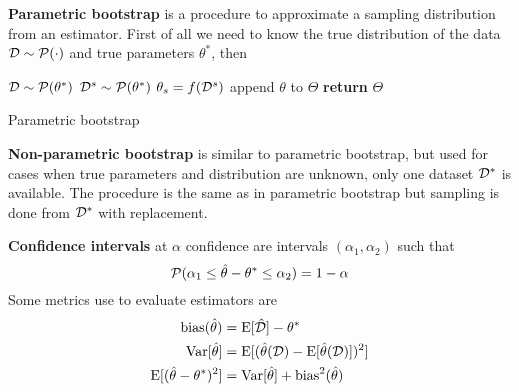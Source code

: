 \documentclass[../../main.tex]{subfiles}
\begin{document}
\textbf{Parametric bootstrap} is a procedure to approximate a sampling distribution from an estimator. First of all we need to know the true distribution of the data $\mathcal{D}\sim\mathcal{P}(\cdot)$ and true parameters $\theta^*$, then 
\begin{algorithm}[H]
\begin{algorithmic}
    \State $\mathcal{D}\sim\mathcal{P}(\theta^*)$
        \State $\mathcal{D}^s \sim \mathcal{P}(\theta^*)$
        \State $\theta_s=f(\mathcal{D}^s)$
        \State append $\theta$ to $\Theta$
    \EndFor
    \State \textbf{return} $\Theta$
\end{algorithmic}
\caption{Parametric bootstrap}
\end{algorithm}

\textbf{Non-parametric bootstrap} is similar to parametric bootstrap, but used for cases when true parameters and distribution are unknown, only one dataset $\mathcal{D}^*$ is available. The procedure is the same as in parametric bootstrap but sampling is done from $\mathcal{D}^*$ with replacement.

\textbf{Confidence intervals} at $\alpha$ confidence are intervals $(\alpha_1,\alpha_2)$ such that
\begin{equation*}
    \mathcal{P}(\alpha_1\le \hat{\theta}-\theta^* \le\alpha_2)=1-\alpha
\end{equation*}
Some metrics use to evaluate estimators are
\begin{align*}
    \mathrm{bias}(\hat{\theta}) &= \mathrm{E}[\hat{\mathcal{D}}]-\theta^*\\
    \mathrm{Var}[\hat{\theta}] &= \mathrm{E}[(\hat{\theta}(\mathcal{D}) - \mathrm{E}[\hat{\theta}(\mathcal{D})] )^2 ]\\
    \mathrm{E}[(\hat{\theta} - \theta^*)^2] &= \mathrm{Var}[\hat{\theta}] + \mathrm{bias}^2(\hat{\theta})
\end{align*}
\end{document}
